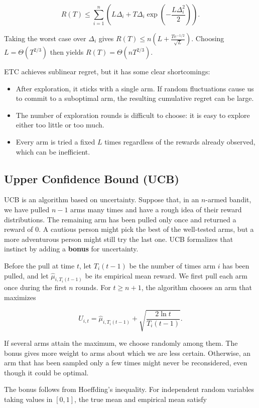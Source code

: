 \documentclass[a4paper,10pt]{article}
\begin{document}
\[
R(T)\le\sum_{i=1}^{n}\left(L\Delta_i+T\Delta_i\exp\left(-\frac{L\Delta_i^2}{2}\right)\right).
\]

Taking the worst case over \(\Delta_i\) gives \(R(T)\le n\left(L+\frac{Te^{-1/2}}{\sqrt L}\right)\). Choosing \(L=\Theta(T^{2/3})\) then yields \(R(T)=\Theta(nT^{2/3})\).

ETC achieves sublinear regret, but it has some clear shortcomings:

\begin{itemize}
  \item After exploration, it sticks with a single arm. If random fluctuations cause us to commit to a suboptimal arm, the resulting cumulative regret can be large.
  \item The number of exploration rounds is difficult to choose: it is easy to explore either too little or too much.
  \item Every arm is tried a fixed \(L\) times regardless of the rewards already observed, which can be inefficient.
\end{itemize}

\subsection{Upper Confidence Bound (UCB)}

UCB is an algorithm based on uncertainty. Suppose that, in an \(n\)-armed bandit, we have pulled \(n-1\) arms many times and have a rough idea of their reward distributions. The remaining arm has been pulled only once and returned a reward of \(0\). A cautious person might pick the best of the well-tested arms, but a more adventurous person might still try the last one. UCB formalizes that instinct by adding a \textbf{bonus} for uncertainty.

Before the pull at time \(t\), let \(T_i(t-1)\) be the number of times arm \(i\) has been pulled, and let \(\hat{\mu}_{i,T_i(t-1)}\) be its empirical mean reward. We first pull each arm once during the first \(n\) rounds. For \(t\ge n+1\), the algorithm chooses an arm that maximizes

\[
U_{i,t}=\hat{\mu}_{i,T_i(t-1)}+\sqrt{\frac{2\ln t}{T_i(t-1)}}.
\]

If several arms attain the maximum, we choose randomly among them. The bonus gives more weight to arms about which we are less certain. Otherwise, an arm that has been sampled only a few times might never be reconsidered, even though it could be optimal.

The bonus follows from Hoeffding's inequality. For independent random variables taking values in \([0,1]\), the true mean and empirical mean satisfy
\end{document}
